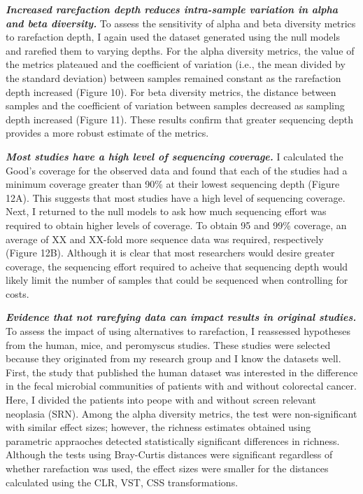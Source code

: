 \documentclass[
]{article}
\begin{document}
\textbf{\emph{Increased rarefaction depth reduces intra-sample variation
in alpha and beta diversity.}} To assess the sensitivity of alpha and
beta diversity metrics to rarefaction depth, I again used the dataset
generated using the null models and rarefied them to varying depths. For
the alpha diversity metrics, the value of the metrics plateaued and the
coefficient of variation (i.e., the mean divided by the standard
deviation) between samples remained constant as the rarefaction depth
increased (Figure 10). For beta diversity metrics, the distance between
samples and the coefficient of variation between samples decreased as
sampling depth increased (Figure 11). These results confirm that greater
sequencing depth provides a more robust estimate of the metrics.

\textbf{\emph{Most studies have a high level of sequencing coverage.}} I
calculated the Good's coverage for the observed data and found that each
of the studies had a minimum coverage greater than 90\% at their lowest
sequencing depth (Figure 12A). This suggests that most studies have a
high level of sequencing coverage. Next, I returned to the null models
to ask how much sequencing effort was required to obtain higher levels
of coverage. To obtain 95 and 99\% coverage, an average of XX and
XX-fold more sequence data was required, respectively (Figure 12B).
Although it is clear that most researchers would desire greater
coverage, the sequencing effort required to acheive that sequencing
depth would likely limit the number of samples that could be sequenced
when controlling for costs.

\textbf{\emph{Evidence that not rarefying data can impact results in
original studies.}} To assess the impact of using alternatives to
rarefaction, I reassessed hypotheses from the human, mice, and
peromyscus studies. These studies were selected because they originated
from my research group and I know the datasets well. First, the study
that published the human dataset was interested in the difference in the
fecal microbial communities of patients with and without colorectal
cancer. Here, I divided the patients into peope with and without screen
relevant neoplasia (SRN). Among the alpha diversity metrics, the test
were non-significant with similar effect sizes; however, the richness
estimates obtained using parametric appraoches detected statistically
significant differences in richness. Although the tests using
Bray-Curtis distances were significant regardless of whether rarefaction
was used, the effect sizes were smaller for the distances calculated
using the CLR, VST, CSS transformations.
\end{document}
